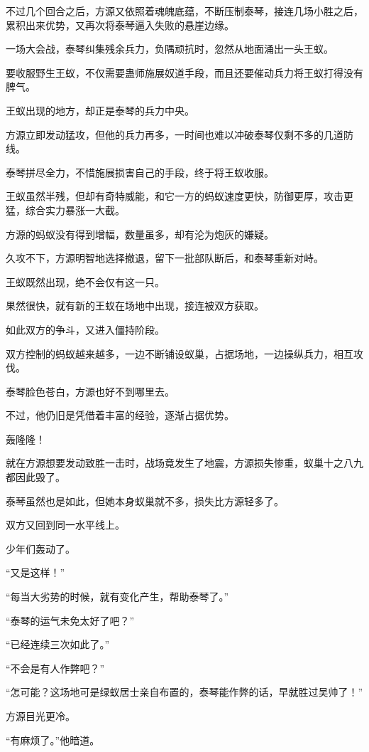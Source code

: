 \begin{this_body}
不过几个回合之后，方源又依照着魂魄底蕴，不断压制泰琴，接连几场小胜之后，累积出来优势，又再次将泰琴逼入失败的悬崖边缘。

一场大会战，泰琴纠集残余兵力，负隅顽抗时，忽然从地面涌出一头王蚁。

要收服野生王蚁，不仅需要蛊师施展奴道手段，而且还要催动兵力将王蚁打得没有脾气。

王蚁出现的地方，却正是泰琴的兵力中央。

方源立即发动猛攻，但他的兵力再多，一时间也难以冲破泰琴仅剩不多的几道防线。

泰琴拼尽全力，不惜施展损害自己的手段，终于将王蚁收服。

王蚁虽然半残，但却有奇特威能，和它一方的蚂蚁速度更快，防御更厚，攻击更猛，综合实力暴涨一大截。

方源的蚂蚁没有得到增幅，数量虽多，却有沦为炮灰的嫌疑。

久攻不下，方源明智地选择撤退，留下一批部队断后，和泰琴重新对峙。

王蚁既然出现，绝不会仅有这一只。

果然很快，就有新的王蚁在场地中出现，接连被双方获取。

如此双方的争斗，又进入僵持阶段。

双方控制的蚂蚁越来越多，一边不断铺设蚁巢，占据场地，一边操纵兵力，相互攻伐。

泰琴脸色苍白，方源也好不到哪里去。

不过，他仍旧是凭借着丰富的经验，逐渐占据优势。

轰隆隆！

就在方源想要发动致胜一击时，战场竟发生了地震，方源损失惨重，蚁巢十之八九都因此毁了。

泰琴虽然也是如此，但她本身蚁巢就不多，损失比方源轻多了。

双方又回到同一水平线上。

少年们轰动了。

“又是这样！”

“每当大劣势的时候，就有变化产生，帮助泰琴了。”

“泰琴的运气未免太好了吧？”

“已经连续三次如此了。”

“不会是有人作弊吧？”

“怎可能？这场地可是绿蚁居士亲自布置的，泰琴能作弊的话，早就胜过吴帅了！”

方源目光更冷。

“有麻烦了。”他暗道。


\end{this_body}
